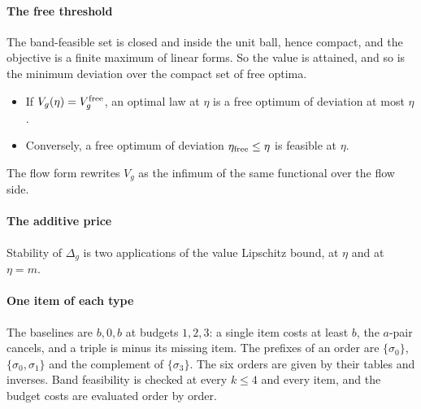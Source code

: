 \paragraph{The free threshold} The band-feasible set is closed and inside the unit ball, hence
compact, and the objective is a finite maximum of linear forms. So the value is attained, and
so is the minimum deviation over the compact set of free optima.
\begin{itemize}
\item If $V_g(\eta)=V^{\rm free}_g$, an optimal law at $\eta$ is a free optimum of deviation at
most $\eta$.
\item Conversely, a free optimum of deviation $\eta_{\rm free}\le\eta$ is feasible at $\eta$.
\end{itemize}
The flow form rewrites $V_g$ as the infimum of the same functional over the flow side.

\paragraph{The additive price} Stability of $\Delta_g$ is two applications of the value
Lipschitz bound, at $\eta$ and at $\eta=m$.

\paragraph{One item of each type} The baselines are $b,0,b$ at budgets $1,2,3$: a single item costs at
least $b$, the $a$-pair cancels, and a triple is minus its missing item. The prefixes of an order
are $\{\sigma_0\}$, $\{\sigma_0,\sigma_1\}$ and the complement of $\{\sigma_3\}$. The six
orders are given by their tables and inverses. Band feasibility is checked at every $k\le4$ and
every item, and the budget costs are evaluated order by order.

